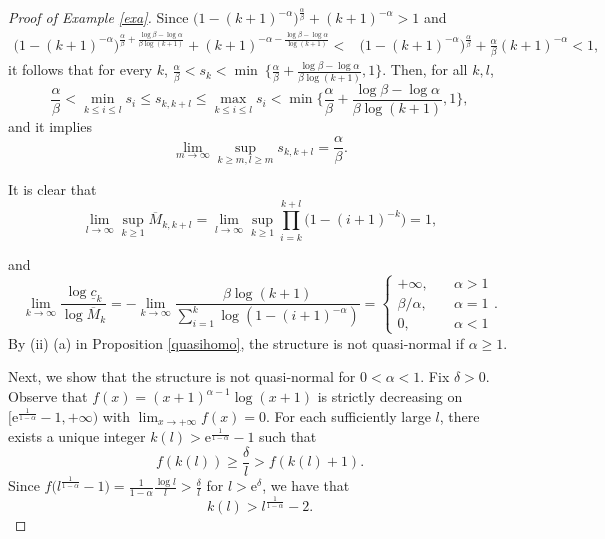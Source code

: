 \documentclass[12pt]{amsart}
\numberwithin{equation}{section}
\theoremstyle{plain}
\theoremstyle{remark}
\theoremstyle{definition}
\newcommand{\om}{\overline{M}}
\newcommand{\de}{\delta}
\newcommand{\f}{\frac}
\newcommand{\uc}{\underline{c}}
\renewcommand{\ge}{\geqslant}
\renewcommand{\le}{\leqslant}
\begin{document}
	\fi
	\begin{proof}[Proof of Example \ref{exa}]
		Since  $
		\big(1-(k+1)^{-\alpha} \big)^{\f\alpha\beta}+ (k+1)^{-\alpha}>1 $
		and
		\begin{align*}
			\big(1- (k+1)^{-\alpha}\big)^{\f\alpha\beta+\f{\log\beta-\log\alpha}{\beta\log(k+1)}}+ (k+1)^{-\alpha -\f{\log\beta-\log\alpha}{\log(k+1)}} 
			<&\big(1- (k+1)^{-\alpha}\big)^{\f\alpha\beta}+\frac{\alpha}{\beta}(k+1)^{-\alpha}< 1,
		\end{align*}
		it follows that for every $k$, $	\f\alpha\beta<s_{k}<\min\ \{\f\alpha\beta+\f{\log\beta-\log\alpha}{\beta\log(k+1)},1 \} $.
		Then,  for all  $k,l$, 
		\begin{equation}\label{est}
			\f\alpha\beta<\min_{k\le i\le l}s_i\le s_{k,k+l}\le \max_{k\le i\le l}s_i<\min\Big\{\f\alpha\beta+\f{\log\beta-\log\alpha}{\beta\log(k+1)},1\Big\},
		\end{equation}
		and it implies  
		\begin{equation}\label{dyl}
			\lim_{m\to\infty}\sup_{k\ge m,l\ge m}s_{k,k+l}=\f\alpha\beta.
		\end{equation}
		
		It is clear that
		$$
		\lim_{l\to \infty}\sup_{k\ge 1}\om_{k,k+l}=\lim_{l\to \infty}\sup_{k\ge 1}\prod_{i=k}^{k+l}\Big(1-(i+1)^{-k}\Big) =1,
		$$

		and
		\begin{equation}\label{con}
			\lim_{k\to\infty}\f{\log\uc_k}{\log \om_k}=-\lim_{k\to\infty}\f{\beta\log(k+1)}{\sum_{i=1}^k\log\left(1-(i+1)^{-\alpha}\right)}=\left\{\begin{array}{ll}
				+\infty,\quad & \alpha>1  \\
				\beta/\alpha, &\alpha=1  \\
				0, & \alpha<1
			\end{array}
			\right..
		\end{equation}
		By (ii) (a) in Proposition \ref{quasihomo},  the structure is not quasi-normal if  $\alpha\ge 1$. 
		
		Next, we   show that the structure is   not quasi-normal for $0<\alpha<1$.
		Fix $\de>0$. Observe that $f(x)=(x+1)^{\alpha-1}\log(x+1)$ is strictly decreasing on $[{\text{e}}^{\f 1{1-\alpha}}-1,+\infty)$ with $\lim_{x\to +\infty}f(x)=0$. For each sufficiently large $l$, there exists a unique integer $k(l)>{\text{e}}^{\f 1{1-\alpha}}-1$ such that
		\begin{equation}\label{non4}
			f(k(l)) \ge \f\de l>f(k(l)+1).
		\end{equation}
		Since $f\big(l^{\f 1{1-\alpha}}-1\big)=\f1{1-\alpha}\f{\log l}l >\f\de l $ for $ l>{\text{e}}^\de$,
		we have that
		\begin{equation}\label{non1}
			k(l)>	l^{\f1{1-\alpha}}-2.
		\end{equation}
		

\end{proof}
\end{document}
